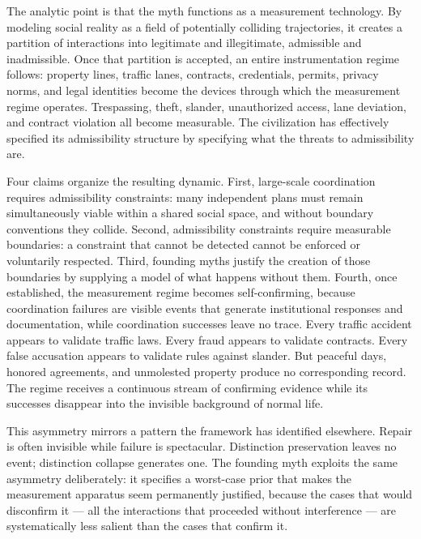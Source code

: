\documentclass[12pt, a4paper]{article}
\theoremstyle{flyxion}
\begin{document}
The analytic point is that the myth functions as a measurement technology. By modeling social reality as a field of potentially colliding trajectories, it creates a partition of interactions into legitimate and illegitimate, admissible and inadmissible. Once that partition is accepted, an entire instrumentation regime follows: property lines, traffic lanes, contracts, credentials, permits, privacy norms, and legal identities become the devices through which the measurement regime operates. Trespassing, theft, slander, unauthorized access, lane deviation, and contract violation all become measurable. The civilization has effectively specified its admissibility structure by specifying what the threats to admissibility are.

Four claims organize the resulting dynamic. First, large-scale coordination requires admissibility constraints: many independent plans must remain simultaneously viable within a shared social space, and without boundary conventions they collide. Second, admissibility constraints require measurable boundaries: a constraint that cannot be detected cannot be enforced or voluntarily respected. Third, founding myths justify the creation of those boundaries by supplying a model of what happens without them. Fourth, once established, the measurement regime becomes self-confirming, because coordination failures are visible events that generate institutional responses and documentation, while coordination successes leave no trace. Every traffic accident appears to validate traffic laws. Every fraud appears to validate contracts. Every false accusation appears to validate rules against slander. But peaceful days, honored agreements, and unmolested property produce no corresponding record. The regime receives a continuous stream of confirming evidence while its successes disappear into the invisible background of normal life.

This asymmetry mirrors a pattern the framework has identified elsewhere. Repair is often invisible while failure is spectacular. Distinction preservation leaves no event; distinction collapse generates one. The founding myth exploits the same asymmetry deliberately: it specifies a worst-case prior that makes the measurement apparatus seem permanently justified, because the cases that would disconfirm it --- all the interactions that proceeded without interference --- are systematically less salient than the cases that confirm it.
\end{document}
